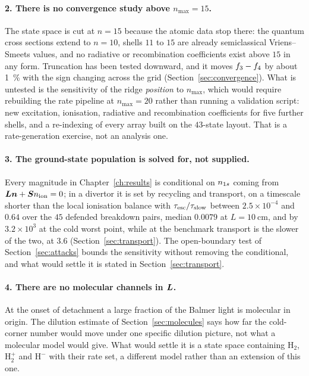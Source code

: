 \paragraph{2. There is no convergence study above $n_{\max} = 15$.} The state
space is cut at $n = 15$ because the atomic data stop there: the quantum
cross sections extend to $n = 10$, shells $11$ to $15$ are already semiclassical
Vriens--Smeets values, and no radiative or recombination coefficients exist
above $15$ in any form. Truncation has been tested downward, and it moves
$f_{3}-f_{4}$ by about \SI{1}{\percent} with the sign changing across
the grid (Section~\ref{sec:convergence}). What is untested is the sensitivity of
the ridge \emph{position} to $n_{\max}$, which would require rebuilding the rate
pipeline at $n_{\max} = 20$ rather than running a validation script: new
excitation, ionisation, radiative and recombination coefficients for five
further shells, and a re-indexing of every array built on the $43$-state layout.
That is a rate-generation exercise, not an analysis one.

\paragraph{3. The ground-state population is solved for, not supplied.} Every
magnitude in Chapter~\ref{ch:results} is conditional on $n_{1s}$ coming from
$\bm{L}\bm{n} + \bm{S}n_{\mathrm{ion}} = 0$; in a divertor it is set by recycling and
transport, on a timescale shorter than the local ionisation balance with
$\tau_{\mathrm{esc}}/\tau_{\mathrm{slow}}$ between $2.5\times10^{-4}$ and $0.64$ over the $45$ defended
breakdown pairs, median $0.0079$ at $L = \SI{10}{\centi\metre}$, and by $3.2\times10^{3}$ at the
cold worst point, while at the benchmark transport is the slower of the two, at
$3.6$ (Section~\ref{sec:transport}). The open-boundary test of
Section~\ref{sec:attacks} bounds the sensitivity without removing the
conditional, and what would settle it is stated in Section~\ref{sec:transport}.

\paragraph{4. There are no molecular channels in $\bm{L}$.} At the onset of
detachment a large fraction of the Balmer light is molecular in origin. The
dilution estimate of Section~\ref{sec:molecules} says how far the cold-corner
number would move under one specific dilution picture, not what a molecular
model would give. What would settle it is a state space containing
$\mathrm{H}_2$, $\mathrm{H}_2^+$ and $\mathrm{H}^-$ with their rate set, a
different model rather than an extension of this one.

